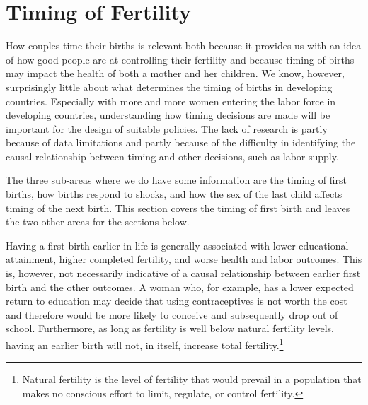 \documentclass[]{article}
\begin{document}
\section{Timing of Fertility}\label{timing-of-fertility}

How couples time their births is relevant both because it provides us with an idea of how good people are at controlling their fertility and because timing of births may impact the health of both a mother and her children. We know, however, surprisingly little about what determines the timing of births in developing countries. Especially with more and more women entering the labor force in developing countries, understanding how timing decisions are made will be important for the design of suitable policies. The lack of research is partly because of data limitations and partly because of the difficulty in identifying the causal relationship between timing and other decisions, such as labor supply.

The three sub-areas where we do have some information are the timing of first births, how births respond to shocks, and how the sex of the last child affects timing of the next birth. This section covers the timing of first birth and leaves the two other areas for the sections below.

Having a first birth earlier in life is generally associated with lower educational attainment, higher completed fertility, and worse health and labor outcomes. This is, however, not necessarily indicative of a causal relationship between earlier first birth and the other outcomes. A woman who, for example, has a lower expected return to education may decide that using contraceptives is not worth the cost and therefore would be more likely to conceive and subsequently drop out of school. Furthermore, as long as fertility is well below natural fertility levels, having an earlier birth will not, in itself, increase total fertility.\footnote{Natural fertility is the level of fertility that would prevail in a population that makes no conscious effort to limit, regulate, or control fertility.}
\end{document}
